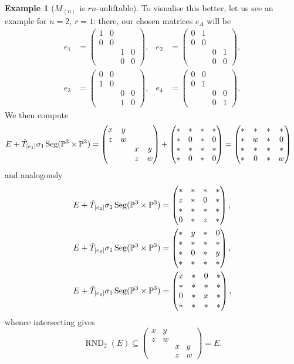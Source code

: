 \documentclass[a4paper,10pt]{article}
\def\gener#1{\left\langle#1\right\rangle}
\def\mtrx#1{\begin{pmatrix}#1\end{pmatrix}}
\DeclareMathOperator{\RND}{RND}
\DeclareMathOperator{\Seg}{Seg}
\theoremstyle{definition}
\newtheorem{example}[theorem]{Example}
\theoremstyle{remark}
\begin{document}
\begin{example}[$M_{\gener n}$ is $rn$-unliftable]
    To visualise this better, let us see an example for $n=2$, $r=1$: there, our chosen matrices $e_A$ will be
    \begin{align*}
        e_1 &= \mtrx{1&0&&\\0&0&&\\&&1&0\\&&0&0}, &
        e_2 &= \mtrx{0&1&&\\0&0&&\\&&0&1\\&&0&0}, \\
        e_3 &= \mtrx{0&0&&\\1&0&&\\&&0&0\\&&1&0}, &
        e_4 &= \mtrx{0&0&&\\0&1&&\\&&0&0\\&&0&1}.
    \end{align*}
    We then compute
    \begin{align*}
        E+\hat T_{[e_1]}\sigma_1\Seg(\pe^3\times\pe^3) &= \mtrx{x&y&&\\z&w&&\\&&x&y\\&&z&w} + \mtrx{*&*&*&*\\ *&0&*&0\\ *&*&*&*\\ *&0&*&0} = \mtrx{*&*&*&*\\ *&w&*&0\\ *&*&*&*\\ *&0&*&w}
    \end{align*}
    and analogously
    \begin{align*}
        E+\hat T_{[e_2]}\sigma_1\Seg(\pe^3\times\pe^3) &= \mtrx{
            *&*&*&*\\
            z&*&0&*\\
            *&*&*&*\\
            0&*&z&*
        },\\
        E+\hat T_{[e_3]}\sigma_1\Seg(\pe^3\times\pe^3) &= \mtrx{
            *&y&*&0\\
            *&*&*&*\\
            *&0&*&y\\
            *&*&*&*
        },\\
        E+\hat T_{[e_4]}\sigma_1\Seg(\pe^3\times\pe^3) &= \mtrx{
            x&*&0&*\\
            *&*&*&*\\
            0&*&x&*\\
            *&*&*&*
        },
    \end{align*}
    whence intersecting gives
    \[
    \RND_2(E) \subseteq
    \mtrx{x&y&&\\z&w&&\\&&x&y\\&&z&w} = E.
    \]
\end{example}
\end{document}
